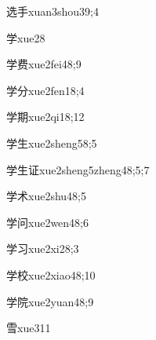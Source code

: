 \begin{verbete}{选手}{xuan3shou3}{9;4}
\end{verbete}

\begin{verbete}{学}{xue2}{8}
\end{verbete}

\begin{verbete}{学费}{xue2fei4}{8;9}
\end{verbete}

\begin{verbete}{学分}{xue2fen1}{8;4}
\end{verbete}

\begin{verbete}{学期}{xue2qi1}{8;12}
\end{verbete}

\begin{verbete}{学生}{xue2sheng5}{8;5}
\end{verbete}

\begin{verbete}{学生证}{xue2sheng5zheng4}{8;5;7}
\end{verbete}

\begin{verbete}{学术}{xue2shu4}{8;5}
\end{verbete}

\begin{verbete}{学问}{xue2wen4}{8;6}
\end{verbete}

\begin{verbete}{学习}{xue2xi2}{8;3}
\end{verbete}

\begin{verbete}{学校}{xue2xiao4}{8;10}
\end{verbete}

\begin{verbete}{学院}{xue2yuan4}{8;9}
\end{verbete}

\begin{verbete}{雪}{xue3}{11}
\end{verbete}

